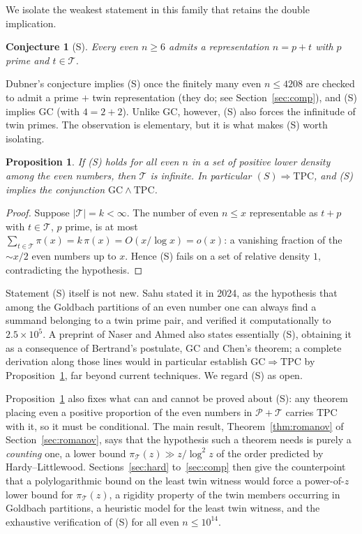 \documentclass[10pt]{article}
\newtheorem{proposition}{Proposition}
\newtheorem{conjecture}{Conjecture}
\theoremstyle{definition}
\theoremstyle{remark}
\newcommand{\T}{\mathcal{T}}
\newcommand{\PP}{\mathcal{P}}
\begin{document}
We isolate the weakest statement in this family that retains the double
implication.

\begin{conjecture}[S]\label{conj:S}
Every even $n \ge 6$ admits a representation $n = p + t$ with $p$ prime
and $t \in \T$.
\end{conjecture}

Dubner's conjecture implies (S) once the finitely many even $n \le 4208$ are
checked to admit a prime $+$ twin representation (they do; see
Section~\ref{sec:comp}), and (S) implies GC (with $4 = 2 + 2$). Unlike GC,
however, (S) also forces the infinitude of twin primes. The observation is
elementary, but it is what makes (S) worth isolating.

\begin{proposition}\label{thm:hierarchy}
If (S) holds for all even $n$ in a set of positive lower density among the
even numbers, then $\T$ is infinite. In particular
$(S) \Rightarrow \mathrm{TPC}$, and (S) implies the conjunction
$\mathrm{GC} \wedge \mathrm{TPC}$.
\end{proposition}

\begin{proof}
Suppose $|\T| = k < \infty$. The number of even $n \le x$ representable as
$t + p$ with $t \in \T$, $p$ prime, is at most
$\sum_{t \in \T} \pi(x) = k\,\pi(x) = O(x/\log x) = o(x)$:
a vanishing fraction of the $\sim x/2$ even numbers up to $x$. Hence (S)
fails on a set of relative density $1$, contradicting the hypothesis.
\end{proof}

Statement (S) itself is not new. Sahu \cite{Sahu} stated it in 2024, as the
hypothesis that among the Goldbach partitions of an even number one can
always find a summand belonging to a twin prime pair, and verified it
computationally to $2.5 \times 10^{5}$. A preprint of Naser and Ahmed
\cite{NA} also states essentially (S), obtaining it as a consequence of
Bertrand's postulate, GC and Chen's theorem; a complete derivation along
those lines would in particular establish
$\mathrm{GC} \Rightarrow \mathrm{TPC}$ by Proposition~\ref{thm:hierarchy},
far beyond current techniques. We regard (S) as open.

Proposition~\ref{thm:hierarchy} also fixes what can and cannot be proved
about (S): any theorem placing even a positive proportion of the even numbers
in $\PP + \T$ carries TPC with it, so it must be conditional. The main result,
Theorem~\ref{thm:romanov} of Section~\ref{sec:romanov}, says that the
hypothesis such a theorem needs is purely a \emph{counting} one, a lower bound
$\pi_\T(z) \gg z/\log^2 z$ of the order predicted by Hardy--Littlewood.
Sections~\ref{sec:hard} to~\ref{sec:comp} then give the counterpoint that a
polylogarithmic bound on the least twin witness would force a power-of-$z$
lower bound for $\pi_\T(z)$, a rigidity property of the twin members occurring
in Goldbach partitions, a heuristic model for the least twin witness, and the
exhaustive verification of (S) for all even $n \le 10^{14}$.
\end{document}
